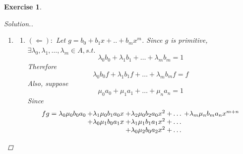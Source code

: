 \documentclass{article}
\theoremstyle{breakstyle}
\newtheorem{exercise}{Exercise}
\newenvironment{solution}
  {\begin{proof}[Solution.]\renewcommand{\qedsymbol}{}}
  {\end{proof}}
\begin{document}
\begin{exercise}
\begin{solution}
\begin{enumerate}[label=({\roman*})]
\begin{enumerate}[label=({\alph*})]
                        If $b_{m}=0$, we're done.
                        Otherwise, similar to \emph{(i)}, by checking the coefficients of $x^{m+n},x^{m+n-1},\ldots $ respectively,
                        we'll obtain
                        $$
                        \begin{cases}
                            a_{n}b_{m}=0\\
                            a_{n-1}b_{m}=0\\
                            a_{n-2}b_{m}^2=0\\
                            \vdots\\
                            a_{1}b_{m}^{n-1}=0\\
                            a_0b_{m}^{n}=0
                        \end{cases}
                        $$
                        So $f\cdot b_{m}^{n}=0$.
                    \item $(\Leftarrow):$
                        Trivial.
                \end{enumerate}
            \item 
                \begin{enumerate}[label=({\alph*})]
                    \item $(\Leftarrow):$
                        Let $g=b_0+b_1x+..+b_{m}x^{m}$.
                        Since $g$ is primitive, $\exists \lambda_0,\lambda_1,\ldots ,\lambda_{m}\in A,s.t.$ 
                        $$
                        \lambda_0b_0+\lambda_1b_1+\ldots +\lambda_{m}b_{m}=1
                        $$
                        Therefore
                        $$
                        \lambda_0b_0f+\lambda_1b_1f+\ldots +\lambda_{m}b_{m}f=f
                        $$
                        Also, suppose
                        $$
                        \mu_0a_0+\mu_1a_1+\ldots +\mu_{n}a_{n}=1
                        $$
                        Since
                        $$
                        \begin{array}{r@{\:}l@{\:}l@{\:}l@{\:}l}
                        fg = \lambda_0 \mu_0 b_0 a_0 & + \lambda_1 \mu_0 b_1 a_0 x & + \lambda_2 \mu_0 b_2 a_0 x^2 & + \dots & + \lambda_m \mu_n b_m a_n x^{m+n} \\
                                                     & + \lambda_0 \mu_1 b_0 a_1 x & + \lambda_1 \mu_1 b_1 a_1 x^2 & + \dots \\
                                                     &                             & + \lambda_0 \mu_2 b_0 a_2 x^2 & + \dots \\

\end{array}$$
\end{enumerate}
\end{enumerate}
\end{solution}
\end{exercise}
\end{document}
